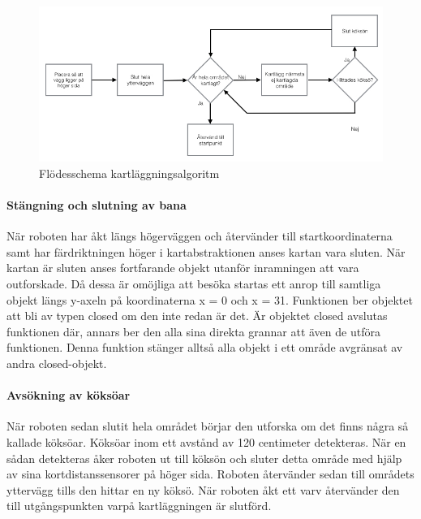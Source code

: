 \documentclass[a4paper,12pt,fleqn]{article}
\begin{document}
\begin{figure}[htp] %
  \begin{center}
  \includegraphics[keepaspectratio=true,width=0.8\linewidth]{bilder/Flode_kartritning.jpg}  %
  \end{center}
  \caption{Flödesschema kartläggningsalgoritm} %
  \label{fig:mapflow} %
\end{figure}

\paragraph{Stängning och slutning av bana}
När roboten har åkt längs högerväggen och återvänder till startkoordinaterna samt har färdriktningen höger i kartabstraktionen anses kartan vara sluten. När kartan är sluten anses fortfarande objekt utanför inramningen att vara outforskade. Då dessa är omöjliga att besöka startas ett anrop till samtliga objekt längs y-axeln på koordinaterna x = 0 och x = 31. Funktionen ber objektet att bli av typen closed om den inte redan är det. Är objektet closed avslutas funktionen där, annars ber den alla sina direkta grannar att även de utföra funktionen. Denna funktion stänger alltså alla objekt i ett område avgränsat av andra closed-objekt.

\paragraph{Avsökning av köksöar}
När roboten sedan slutit hela området börjar den utforska om det finns några så kallade köksöar. Köksöar inom ett avstånd av 120 centimeter detekteras. När en sådan detekteras åker roboten ut till köksön och sluter detta område med hjälp av sina kortdistanssensorer på höger sida. Roboten återvänder sedan till områdets yttervägg tills den hittar en ny köksö. När roboten åkt ett varv återvänder den till utgångspunkten varpå kartläggningen är slutförd. 
\end{document}
